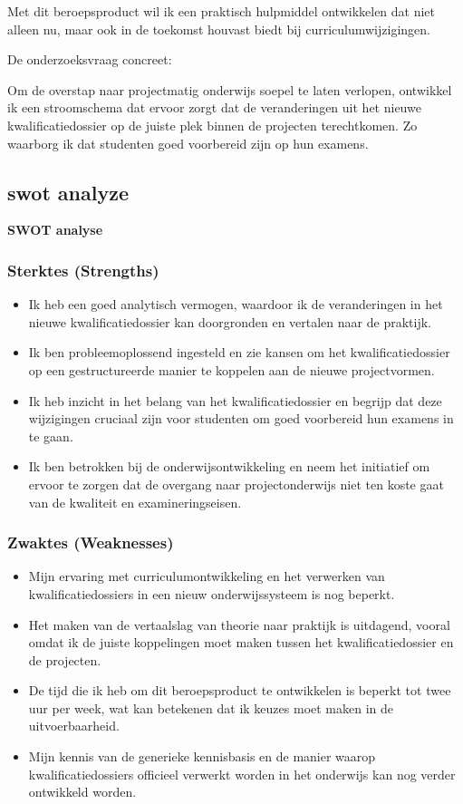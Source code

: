 Met dit beroepsproduct wil ik een praktisch hulpmiddel ontwikkelen dat niet alleen nu, maar ook in de toekomst houvast biedt bij curriculumwijzigingen.

 
De onderzoeksvraag concreet: 
\begin{displayquote}    
    Om de overstap naar projectmatig onderwijs soepel te laten verlopen, ontwikkel ik een stroomschema dat ervoor zorgt dat de veranderingen uit het nieuwe kwalificatiedossier op de juiste plek binnen de projecten terechtkomen. Zo waarborg ik dat studenten goed voorbereid zijn op hun examens. 
\end{displayquote}


\subsection{swot analyze}

\textbf{SWOT analyse}

\subsubsection{Sterktes (Strengths)}
\begin{itemize}
    \item Ik heb een goed analytisch vermogen, waardoor ik de veranderingen in het nieuwe kwalificatiedossier kan doorgronden en vertalen naar de praktijk.
    \item Ik ben probleemoplossend ingesteld en zie kansen om het kwalificatiedossier op een gestructureerde manier te koppelen aan de nieuwe projectvormen.
    \item Ik heb inzicht in het belang van het kwalificatiedossier en begrijp dat deze wijzigingen cruciaal zijn voor studenten om goed voorbereid hun examens in te gaan.
    \item Ik ben betrokken bij de onderwijsontwikkeling en neem het initiatief om ervoor te zorgen dat de overgang naar projectonderwijs niet ten koste gaat van de kwaliteit en examineringseisen.
\end{itemize}

\subsubsection{Zwaktes (Weaknesses)}
\begin{itemize}
    \item  Mijn ervaring met curriculumontwikkeling en het verwerken van kwalificatiedossiers in een nieuw onderwijssysteem is nog beperkt.
    \item Het maken van de vertaalslag van theorie naar praktijk is uitdagend, vooral omdat ik de juiste koppelingen moet maken tussen het kwalificatiedossier en de projecten.
    \item De tijd die ik heb om dit beroepsproduct te ontwikkelen is beperkt tot twee uur per week, wat kan betekenen dat ik keuzes moet maken in de uitvoerbaarheid.
    \item Mijn kennis van de generieke kennisbasis en de manier waarop kwalificatiedossiers officieel verwerkt worden in het onderwijs kan nog verder ontwikkeld worden.
\end{itemize}

